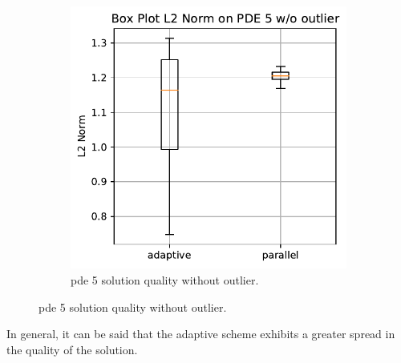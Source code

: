 \documentclass[./\jobname.tex]{subfiles}
\begin{document}
\begin{figure}[h]
\begin{subfigure}[b]{0.39\linewidth}
		\includegraphics[width=1\textwidth]{../../code/experiments/experiment_2/pde5_L2_norm_boxplot_wo_outlier.pdf}
		\caption{\gls{pde} 5 solution quality without outlier. }
		\label{fig:paJADE_pde5_l2norm_boxplot_cleared}
	\end{subfigure}%
	\label{fig:paJADE_pde5_l2norm_boxplot_comparison}
\end{figure}
In general, it can be said that the adaptive scheme exhibits a greater spread in the quality of the solution. 
\end{document}
